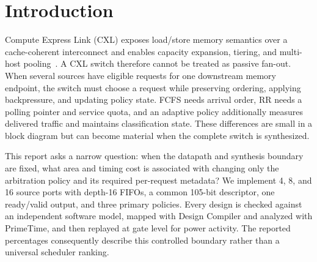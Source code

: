 \begin{abstract}
CXL memory pooling turns arbitration into a hardware design decision: each policy requires different ordering state, service history, and control logic. This report compares first-come, first-served (FCFS), round robin (RR), and an FAI-inspired fairness-aware scheduler in one SystemVerilog switch framework. We hold the 105-bit descriptor datapath, depth-16 FIFOs, one-output interface, and synthesis boundary fixed while varying only the policy and its required metadata. Independent Python models, directed and randomized simulation, mapped-netlist equivalence, and a controlled side-effect test support correctness. All nine primary configurations close at 25\,ns in a pre-layout SAED32 flow. Relative to FCFS, the fairness-aware design adds 4.97--5.89\% total mapped area; relative to RR it adds 38.22--39.27\%. FIFO subtrees occupy 92.40--98.63\% of the complete area. Qualified cold-start power preserves RR $<$ FCFS $<$ Main across three seeds. A second, pseudocode-grounded FAI interpretation changes behavior but changes the measured four-source area by only 0.028626\%. These are descriptor-level results, not claims of full CXL compliance, application fairness, maximum frequency, or physical signoff.
\end{abstract}

\section{Introduction}
Compute Express Link (CXL) exposes load/store memory semantics over a cache-coherent interconnect and enables capacity expansion, tiering, and multi-host pooling~\cite{cxl_intro}. A CXL switch therefore cannot be treated as passive fan-out. When several sources have eligible requests for one downstream memory endpoint, the switch must choose a request while preserving ordering, applying backpressure, and updating policy state. FCFS needs arrival order, RR needs a polling pointer and service quota, and an adaptive policy additionally measures delivered traffic and maintains classification state. These differences are small in a block diagram but can become material when the complete switch is synthesized.

This report asks a narrow question: when the datapath and synthesis boundary are fixed, what area and timing cost is associated with changing only the arbitration policy and its required per-request metadata? We implement 4, 8, and 16 source ports with depth-16 FIFOs, a common 105-bit descriptor, one ready/valid output, and three primary policies. Every design is checked against an independent software model, mapped with Design Compiler and analyzed with PrimeTime, and then replayed at gate level for power activity. The reported percentages consequently describe this controlled boundary rather than a universal scheduler ranking.

